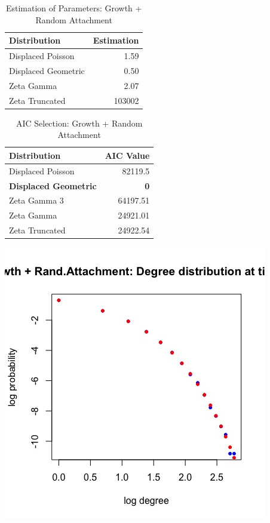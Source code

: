 \documentclass[12pt, a4paper]{article}
\begin{document}
\begin{table}[H]
    \centering
    \begin{tabular}{l r}
        Distribution & Estimation\\
        \hline
        Displaced Poisson & 1.59\\
        Displaced Geometric & 0.50\\
        Zeta Gamma & 2.07\\ 
        Zeta Truncated & 103002\\
    \end{tabular}
    \caption{Estimation of Parameters: Growth + Random Attachment}
    \label{table:grow_ran_att_2}
\end{table}

\begin{table}[H]
    \centering
    \begin{tabular}{l r}
        Distribution & AIC Value\\
        \hline
        Displaced Poisson & 82119.5\\
        \textbf{Displaced Geometric} & \textbf{0}\\
        Zeta Gamma 3 & 64197.51\\
        Zeta Gamma & 24921.01\\ 
        Zeta Truncated & 24922.54\\
    \end{tabular}
    \caption{AIC Selection: Growth + Random Attachment}
    \label{table:grow_ran_att_3}
\end{table}

\begin{minipage}[t]{\linewidth}
    \includegraphics[width=\textwidth]{degree_tmax_grow_random_att}
    \captionsetup{type=figure}
    \label{fig:degree_tmax_grow_pref_att}
  \end{minipage}
\end{document}
